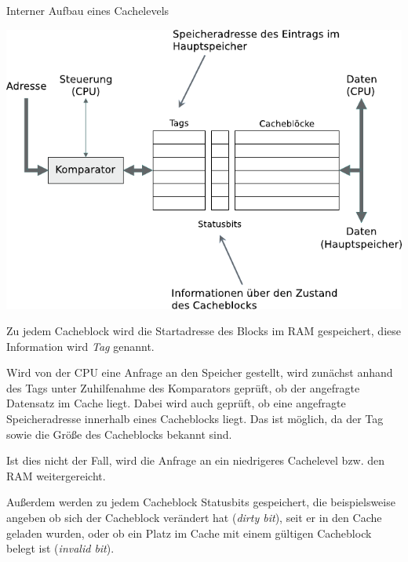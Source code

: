 \begin{bonus}{Interner Aufbau eines Cachelevels}
    \begin{center}
        \includegraphics[]{images/cache_level.pdf}
    \end{center}

    Zu jedem Cacheblock wird die Startadresse des Blocks im RAM gespeichert, diese
    Information wird \emph{Tag} genannt.

    Wird von der CPU eine Anfrage an den Speicher
    gestellt, wird zunächst anhand des Tags unter Zuhilfenahme des Komparators geprüft, ob der angefragte Datensatz im Cache liegt. Dabei wird auch geprüft, ob eine
    angefragte Speicheradresse innerhalb eines Cacheblocks liegt. Das ist möglich, da
    der Tag sowie die Größe des Cacheblocks bekannt sind.

    Ist dies nicht der Fall, wird
    die Anfrage an ein niedrigeres Cachelevel bzw. den RAM weitergereicht.

    Außerdem
    werden zu jedem Cacheblock Statusbits gespeichert, die beispielsweise angeben ob
    sich der Cacheblock verändert hat (\emph{dirty bit}), seit er in den Cache geladen wurden,
    oder ob ein Platz im Cache mit einem gültigen Cacheblock belegt ist (\emph{invalid bit}).
\end{bonus}

